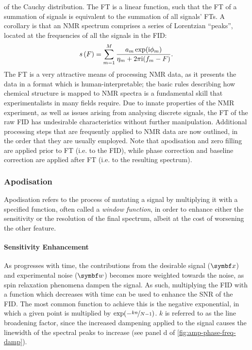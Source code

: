 of the Cauchy distribution. The \ac{FT} is a linear function, such that the
\ac{FT} of a summation of signals is equivalent to the summation of all
signals' \acp{FT}. A corollary is that an \ac{NMR} spectrum comprises a
series of Lorentzian ``peaks'', located at the frequencies of all the signals
in the \ac{FID}:
\begin{equation}
    s\left(F\right) = \sum_{m=1}^{M}
    \frac{\amexpphim}
    {\eta_m + 2 \pi \iu (f_m - F)}.
    \label{eq:ft-summation}%
\end{equation}
The \ac{FT} is a very attractive means of processing \ac{NMR} data, as it
presents the data in a format which is human-interpretable; the basic
rules describing how chemical structure is mapped to \ac{NMR} spectra
is a fundamental skill that experimentalists in many fields
require\cite{Hore2015b}. Due to innate properties of the \ac{NMR} experiment,
as well as issues arising from analysing discrete signals, the \ac{FT} of
the raw \ac{FID} has undesirable
characteristics without further manipulation. Additional processing
steps that are frequently applied to \ac{NMR} data are now outlined, in the
order that they are usually employed. Note that apodisation and zero filling
are applied prior to \ac{FT} (i.e. to the \ac{FID}), while phase
correction and baseline correction are applied after \ac{FT} (i.e. to the
resulting spectrum).

\subsubsection{Apodisation}
Apodisation refers to the process of mutating a signal by multiplying it with a
specified function, often called a \emph{window function}\cite[Section
3.2.7]{Claridge2016}, in order to enhance
either the sensitivity or the resolution of the final spectrum, albeit
at the cost of worsening the other feature.

\paragraph{Sensitivity Enhancement} As  progresses with time, the
contributions from the desirable signal ($\bx$) and experimental noise ($\bw$)
becomes more
weighted towards the noise, as spin relaxation phenomena dampen the signal. As
such, multiplying the \ac{FID} with a function which decreases with time
can be used to enhance the \ac{SNR} of the
\ac{FID}. The most common function to achieve this is the negative exponential,
in which a given point is multiplied by $\exp(-\nicefrac{k n}{N - 1})$.
$k$ is referred to as the line broadening factor, since the increased dampening
applied to the signal causes the linewidth of the spectral peaks to increase
(see panel d of \cref{fig:amp-phase-freq-damp}).

